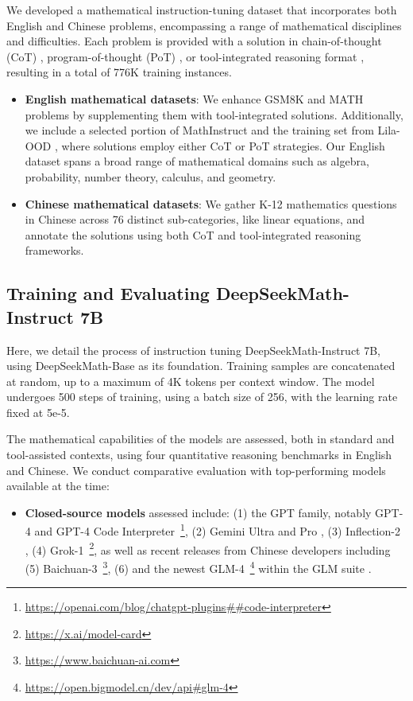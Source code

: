 We developed a mathematical instruction-tuning dataset that incorporates both English and Chinese problems, encompassing a range of mathematical disciplines and difficulties. Each problem is provided with a solution in chain-of-thought (CoT) \citep{cot}, program-of-thought (PoT) \citep{pot,pal}, or tool-integrated reasoning format \citep{tora}, resulting in a total of 776K training instances.

\begin{itemize}[topsep=0pt]
    \item \textbf{English mathematical datasets}: We enhance GSM8K and MATH problems by supplementing them with tool-integrated solutions. Additionally, we include a selected portion of MathInstruct \citep{MathInstruct} and the training set from Lila-OOD \citep{lila}, where solutions employ either CoT or PoT strategies. Our English dataset spans a broad range of mathematical domains such as algebra, probability, number theory, calculus, and geometry.
    \item \textbf{Chinese mathematical datasets}: We gather K-12 mathematics questions in Chinese across 76 distinct sub-categories, like linear equations, and annotate the solutions using both CoT and tool-integrated reasoning frameworks.
\end{itemize}

\subsection{Training and Evaluating DeepSeekMath-Instruct 7B}

Here, we detail the process of instruction tuning DeepSeekMath-Instruct 7B, using DeepSeekMath-Base as its foundation. Training samples are concatenated at random, up to a maximum of 4K tokens per context window. The model undergoes 500 steps of training, using a batch size of 256, with the learning rate fixed at 5e-5.

The mathematical capabilities of the models are assessed, both in standard and tool-assisted contexts, using four quantitative reasoning benchmarks in English and Chinese. We conduct comparative evaluation with top-performing models available at the time:

\begin{itemize}[topsep=0pt]
    \item \textbf{Closed-source models} assessed include: (1) the GPT family, notably GPT-4 \citep{gpt4} and GPT-4 Code Interpreter~\footnote{\url{https://openai.com/blog/chatgpt-plugins\#\#code-interpreter}}, (2) Gemini Ultra and Pro \citep{gemini}, (3) Inflection-2 \citep{inflection-2}, (4) Grok-1~\footnote{\url{https://x.ai/model-card}}, as well as recent releases from Chinese developers including (5) Baichuan-3~\footnote{\url{https://www.baichuan-ai.com}}, (6) and the newest GLM-4~\footnote{\url{https://open.bigmodel.cn/dev/api\#glm-4}} within the GLM suite \citep{glm}.
\end{itemize}

